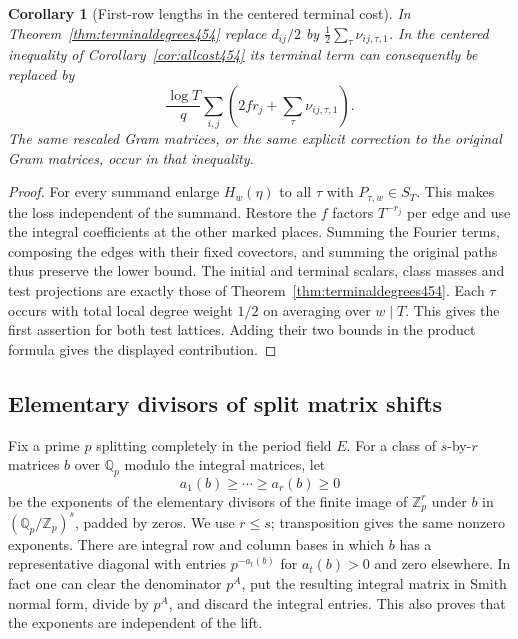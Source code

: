 \documentclass[a4paper,11pt]{article}
\newtheorem{corollary}[proposition]{Corollary}
\theoremstyle{definition}
\theoremstyle{remark}
\numberwithin{equation}{section}
\begin{document}
\begin{corollary}[First-row lengths in the centered terminal cost]\leavevmode
\label{cor:terminalrow455}
In Theorem~\ref{thm:terminaldegrees454} replace \(d_{ij}/2\)
by \(\tfrac12\sum_\tau \nu_{ij,\tau,1}\). In the centered
inequality of Corollary~\ref{cor:allcost454} its terminal term
can consequently be replaced by
\[
                 \frac{\log T}{q}\sum_{i,j}
                       \left(2fr_j+\sum_\tau\nu_{ij,\tau,1}\right).
\]
The same rescaled Gram matrices, or the same explicit correction
to the original Gram matrices, occur in that inequality.
\end{corollary}
\begin{proof}
For every summand enlarge \(H_w(\eta)\) to all
\(\tau\) with \(P_{\tau,w}\in S_T\). This makes the loss
independent of the summand. Restore the \(f\) factors
\(T^{-r_j}\) per edge and use the integral coefficients at
the other marked places. Summing the Fourier terms, composing
the edges with their fixed covectors, and summing the original
paths thus preserve the lower bound. The initial and terminal
scalars, class masses and test projections are exactly those
of Theorem~\ref{thm:terminaldegrees454}. Each \(\tau\) occurs
with total local degree weight \(1/2\) on averaging over
\(w\mid T\). This gives the first assertion for both test
lattices. Adding their two bounds in the product formula
gives the displayed contribution.
\end{proof}


\subsection{Elementary divisors of split matrix shifts}
\label{sec:splitmatrixtorsion456}

Fix a prime \(p\) splitting completely in the period field
\(E\). For a class of \(s\)-by-\(r\) matrices
\(b\) over \(\mathbb Q_p\) modulo the integral matrices, let
\[
                 a_1(b)\ge\cdots\ge a_r(b)\ge0
\]
be the exponents of the elementary divisors of the finite
image of \(\mathbb Z_p^r\) under \(b\) in
\((\mathbb Q_p/\mathbb Z_p)^s\), padded by zeros. We use
\(r\le s\); transposition gives the same nonzero exponents.
There are integral row and column bases in which \(b\) has a
representative diagonal with entries \(p^{-a_t(b)}\) for
\(a_t(b)>0\) and zero elsewhere. In fact one can clear the
denominator \(p^A\), put the resulting integral matrix in Smith
normal form, divide by \(p^A\), and discard the integral entries.
This also proves that the exponents are independent of the lift.
\end{document}
